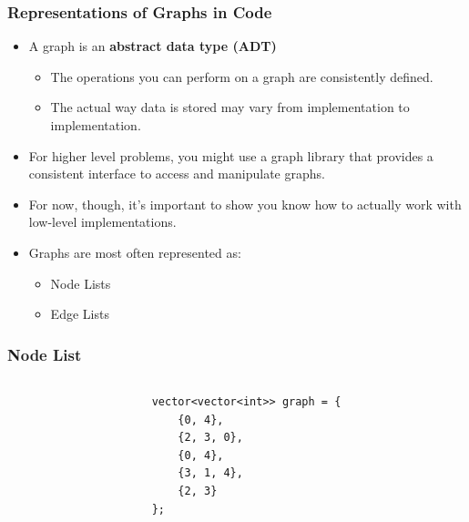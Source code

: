 \documentclass[aspectratio=169]{beamer}
\begin{document}
\begin{frame}
    \frametitle{Representations of Graphs in Code}
    \begin{itemize}
        \item A graph is an \textbf{abstract data type (ADT)}
        \pause
        \begin{itemize}
            \item The operations you can perform on a graph are consistently defined.
            \item The actual way data is stored may vary from implementation to implementation.
        \end{itemize}
        \pause
        \item For higher level problems, you might use a graph library that provides a consistent interface to access and manipulate graphs.
        \item For now, though, it's important to show you know how to actually work with low-level implementations.
        \pause
        \item Graphs are most often represented as:
        \begin{itemize}
            \item Node Lists
            \item Edge Lists
        \end{itemize}
    \end{itemize}
\end{frame}
\begin{frame}[fragile]
    \frametitle{Node List}
    \begin{columns}
        \begin{column}{0.5\textwidth}
        \end{column}
        \begin{column}{0.5\textwidth}
            \begin{lstlisting}
vector<vector<int>> graph = {
    {0, 4},
    {2, 3, 0},
    {0, 4},
    {3, 1, 4},
    {2, 3}
};
            \end{lstlisting}
        \end{column}
    \end{columns}

\end{frame}
\end{document}
